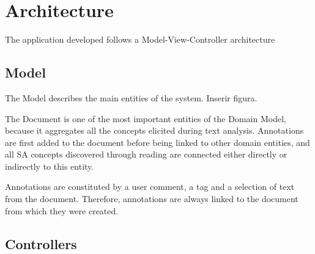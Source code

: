 
\chapter{Architecture}
\label{chapter:architecture}

The application developed follows a Model-View-Controller architecture





\section{Model}
The Model describes the main entities of the system.
Inserir figura.

The Document is one of the most important entities of the Domain Model, because it aggregates all the concepts elicited during text analysis. Annotations are first added to the document before being linked to other domain entities, and all SA concepts discovered through reading are connected either directly or indirectly to this entity.



Annotations are constituted by a user comment, a tag and a selection of text from the document. Therefore, annotations are always linked to the document from which they were created.



\section{Controllers}

